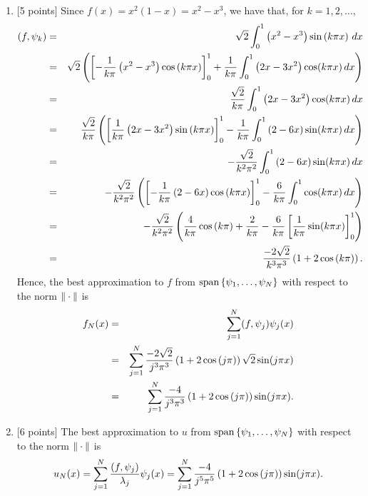
\begin{solution}
\begin{enumerate}
\item {[5 points]} Since $f(x) = x^2(1-x) = x^2-x^3$, we have that, for $k=1,2,\ldots$,
\begin{eqnarray*}
(f,\psi_k)&=&\sqrt{2}\int_0^1 \left(x^2-x^3\right) \sin\left(k\pi x\right)\, dx
\\
&=&\sqrt{2}\left(\left[-{1\over k\pi}\left(x^2-x^3\right)\cos\left(k\pi x\right)\right]_0^1+{1\over k\pi}\int_0^1 \left(2x-3x^2\right) \cos(k\pi x)\, dx\right)
\\
&=&{\sqrt{2}\over k\pi}\int_0^1 \left(2x-3x^2\right) \cos(k\pi x)\, dx
\\
&=&{\sqrt{2}\over k\pi}\left(\left[{1\over k\pi}\left(2x-3x^2\right)\sin\left(k\pi x\right)\right]_0^1-{1\over k\pi}\int_0^1 \left(2-6x\right) \sin(k\pi x)\, dx\right)
\\
&=&-{\sqrt{2}\over k^2\pi^2}\int_0^1 \left(2-6x\right) \sin(k\pi x)\, dx
\\
&=&-{\sqrt{2}\over k^2\pi^2}\left(\left[-{1\over k\pi}\left(2-6x\right)\cos\left(k\pi x\right)\right]_0^1-{6\over k\pi}\int_0^1 \cos(k\pi x)\, dx\right)
\\
&=&-{\sqrt{2}\over k^2\pi^2}\left({4\over k\pi}\cos\left(k\pi\right)+{2\over k\pi}-{6\over k\pi}\left[{1\over k\pi}\sin(k\pi x)\right]_0^1\right)
\\
&=&{-2\sqrt{2}\over k^3\pi^3}\left(1+2\cos\left(k\pi\right)\right).
\end{eqnarray*}
Hence, the best approximation to $f$ from ${\rm span}\left\{\psi_1,\ldots,\psi_N\right\}$ with respect to the norm $\|\cdot\|$ is
\begin{eqnarray*}
f_N(x)&=&\sum_{j=1}^N(f,\psi_j)\psi_j(x)
\\
&=&\sum_{j=1}^N{-2\sqrt{2}\over j^3\pi^3}\left(1+2\cos\left(j\pi\right)\right)\sqrt{2}\sin(j\pi x)
\\
&=&\sum_{j=1}^N{-4\over j^3\pi^3}\left(1+2\cos\left(j\pi\right)\right)\sin(j\pi x).
\end{eqnarray*}

\item {[6 points]} The best approximation to $u$ from ${\rm span}\left\{\psi_1,\ldots,\psi_N\right\}$ with respect to the norm $\|\cdot\|$ is
\[
u_N(x)=\sum_{j=1}^N{(f,\psi_j) \over \lambda_j}\psi_j(x)=\sum_{j=1}^N{-4\over j^5\pi^5}\left(1+2\cos\left(j\pi\right)\right)\sin(j\pi x).
\]


\end{enumerate}
\end{solution}
